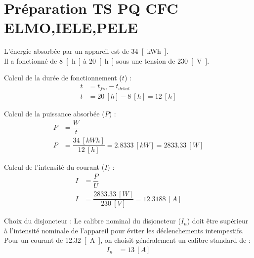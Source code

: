 \documentclass[a4paper,11pt,answers,addpoints]{exam}
\begin{document}
	\unframedsolutions
	\pointsinmargin
	\bracketedpoints
	
\section*{Préparation TS PQ CFC ELMO,IELE,PELE}
\begin{questions}
\question L'énergie absorbée par un appareil est de \qty{34}{[kWh]}.\\ Il a fonctionné de \qty{8}{[h]} à \qty{20}{[h]} sous une tension de \qty{230}{[V]}.


\begin{solution}
	Calcul de la durée de fonctionnement ($t$) :
	\begin{align*}
		t &= t_{fin} - t_{debut} \\[6pt]
		t &= \qty{20}{[h]} - \qty{8}{[h]} = \qty{12}{[h]}
	\end{align*}
	
	Calcul de la puissance absorbée ($P$) :
	\begin{align*}
		P &= \dfrac{W}{t} \\[6pt]
		P &= \dfrac{\qty{34}{[kWh]}}{\qty{12}{[h]}} = \qty{2,8333}{[kW]} = \qty{2833,33}{[W]}
	\end{align*}
	
	Calcul de l'intensité du courant ($I$) :
	\begin{align*}
		I &= \dfrac{P}{U} \\[6pt]
		I &= \dfrac{\qty{2833,33}{[W]}}{\qty{230}{[V]}} = \qty{12,3188}{[A]}
	\end{align*}
	
	Choix du disjoncteur :
	Le calibre nominal du disjoncteur ($I_n$) doit être supérieur à l'intensité nominale de l'appareil pour éviter les déclenchements intempestifs. Pour un courant de \qty{12,32}{[A]}, on choisit généralement un calibre standard de :
	\begin{align*}
		I_n &= \qty{13}{[A]}
	\end{align*}
	

\end{solution}
\end{questions}
\end{document}

